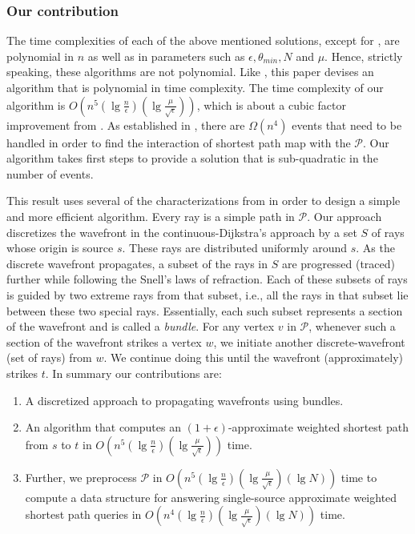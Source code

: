 \documentclass[11pt]{article}
\def\calP{\mathcal{P}}
\begin{document}
\subsubsection*{Our contribution}

The time complexities of each of the above mentioned solutions, except for \cite{journals/jacm/MitchellP91}, are polynomial in $n$ as well as in parameters such as $\epsilon, \theta_{min}, N$ and $\mu$.
Hence, strictly speaking, these algorithms are not polynomial.
Like \cite{journals/jacm/MitchellP91}, this paper devises an algorithm that is polynomial in time complexity.
The time complexity of our algorithm is $O(n^5(\lg{\frac{n}{\epsilon}})(\lg{\frac{\mu}{\sqrt{\epsilon}}}))$, which is about a cubic factor improvement from \cite{journals/jacm/MitchellP91}.
As established in \cite{journals/jacm/MitchellP91}, there are  $\Omega(n^4)$ events that need to be handled in order to find the interaction of shortest path map with the $\calP$.
Our algorithm takes first steps to provide a solution that is sub-quadratic in the number of events.

This result uses several of the characterizations from \cite{journals/jacm/MitchellP91} in order to design a simple and more efficient algorithm.
Every ray is a simple path in $\mathcal{P}$.
Our approach discretizes the wavefront in the continuous-Dijkstra's approach by a set $S$ of rays whose origin is source $s$.
These rays are distributed uniformly around $s$.
As the discrete wavefront propagates, a subset of the rays in $S$ are progressed (traced) further while following the Snell's laws of refraction.
Each of these subsets of rays is guided by two extreme rays from that subset, i.e., all the rays in that subset lie between these two special rays. 
Essentially, each such subset represents a section of the wavefront and is called a {\em bundle}.
For any vertex $v$ in $\calP$, whenever such a section of the wavefront strikes a vertex $w$, we initiate another discrete-wavefront (set of rays) from $w$.
We continue doing this until the wavefront (approximately) strikes $t$.
In summary our contributions are:
\begin{enumerate}
\item A discretized approach to propagating wavefronts using bundles.
\item
An algorithm that computes an $(1+\epsilon)$-approximate weighted shortest path from $s$ to $t$ in $O(n^5(\lg{\frac{n}{\epsilon}})(\lg{\frac{\mu}{\sqrt{\epsilon}}}))$ time.
\item
Further, we preprocess $\calP$ in $O(n^5(\lg{\frac{n}{\epsilon}})(\lg{\frac{\mu}{\sqrt{\epsilon}}})(\lg{N}))$ time to compute a data structure for answering single-source approximate weighted shortest path queries in $O(n^4(\lg{\frac{n}{\epsilon}})(\lg{\frac{\mu}{\sqrt{\epsilon}}})(\lg{N}))$ time.
\end{enumerate}
\end{document}
